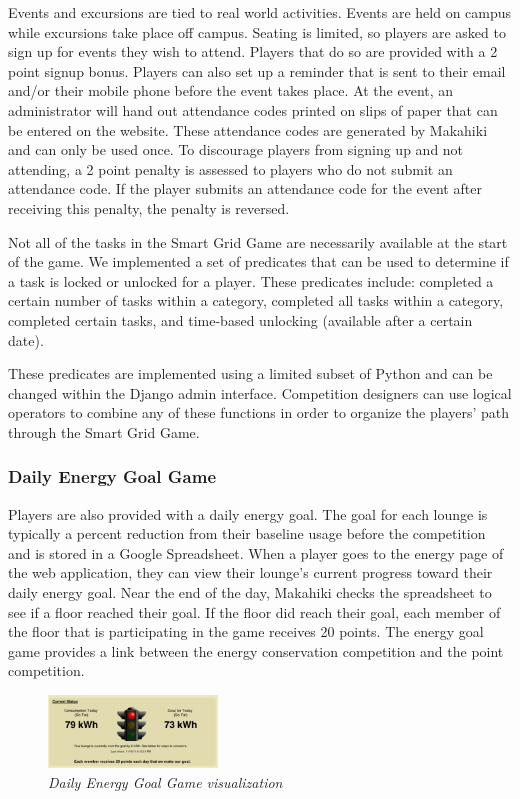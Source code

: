 \documentclass{acm_proc_article-sp}
\begin{document}
Events and excursions are tied to real world activities. Events are held on campus while excursions take place off campus. Seating is limited, so players are asked to sign up for events they wish to attend. Players that do so are provided with a 2 point signup bonus. Players can also set up a reminder that is sent to their email and/or their mobile phone before the event takes place. At the event, an administrator will hand out attendance codes printed on slips of paper that can be entered on the website. These attendance codes are generated by Makahiki and can only be used once. To discourage players from signing up and not attending, a 2 point penalty is assessed to players who do not submit an attendance code. If the player submits an attendance code for the event after receiving this penalty, the penalty is reversed.

Not all of the tasks in the Smart Grid Game are necessarily available at
the start of the game. We implemented a set of predicates that can be used to determine if a task is locked or unlocked for a player. These predicates include: completed a certain number of tasks within a category, completed all tasks within a category, completed certain tasks, and time-based unlocking (available after a certain date).

These predicates are implemented using a limited subset of Python and can
be changed within the Django admin interface. Competition designers can use
logical operators to combine any of these functions in order to organize
the players' path through the Smart Grid Game.

\subsubsection{Daily Energy Goal Game}
\label{sys:goal-game}

Players are also provided with a daily energy goal. The goal for each lounge is typically a percent reduction from their baseline usage before the competition and is stored in a Google Spreadsheet. When a player goes to the energy page of the web application, they can view their lounge's current progress toward their daily energy goal. Near the end of the day, Makahiki checks the spreadsheet to see if a floor reached their goal. If the floor did reach their goal, each member of the floor that is participating in the game receives 20 points. The energy goal game provides a link between the energy conservation competition and the point competition.

\begin{figure}[t!]
  \center
  \includegraphics[width=0.4\textwidth]{daily-energy-goal-game.eps}
  \caption{\em \small Daily Energy Goal Game visualization}
  \label{fig:DailyEnergyGoal}
\end{figure}
\end{document}
